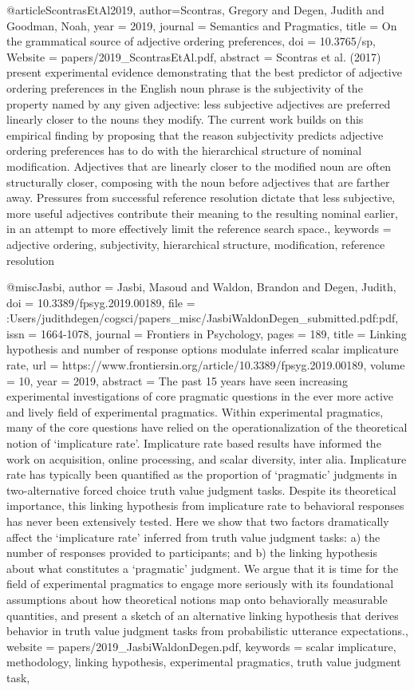 {@article{ScontrasEtAl2019,
author={Scontras, Gregory and Degen, Judith and Goodman, Noah},
year = {2019},
journal = {Semantics and Pragmatics},
title = {On the grammatical source of adjective ordering preferences},
doi = {10.3765/sp},
Website = {papers/2019_ScontrasEtAl.pdf},
abstract = {Scontras et al. (2017) present experimental evidence demonstrating that the best predictor of adjective ordering preferences in the English noun phrase is the subjectivity of the property named by any given adjective: less subjective adjectives are preferred linearly closer to the nouns they modify. The current work builds on this empirical finding by proposing that the reason subjectivity predicts adjective ordering preferences has to do with the hierarchical structure of nominal modification. Adjectives that are linearly closer to the modified noun are often structurally closer, composing with the noun before adjectives that are farther away. Pressures from successful reference resolution dictate that less subjective, more useful adjectives contribute their meaning to the resulting nominal earlier, in an attempt to more effectively limit the reference search space.},
keywords = {adjective ordering, subjectivity, hierarchical structure, modification, reference resolution}
}

@misc{Jasbi,
author = {Jasbi, Masoud and Waldon, Brandon and Degen, Judith},
doi = {10.3389/fpsyg.2019.00189},      
file = {:Users/judithdegen/cogsci/papers{\_}misc/JasbiWaldonDegen{\_}submitted.pdf:pdf},
issn = {1664-1078},   
journal = {Frontiers in Psychology},      
pages = {189},     
title = {{Linking hypothesis and number of response options modulate inferred scalar implicature rate}},
url = {https://www.frontiersin.org/article/10.3389/fpsyg.2019.00189},       
volume = {10},      
year = {2019},
abstract = {The past 15 years have seen increasing experimental investigations of core pragmatic questions in the ever more active and lively field of experimental pragmatics. Within experimental pragmatics, many of the core questions have relied on the operationalization of the theoretical notion of `implicature rate'. Implicature rate based results have informed the work on acquisition, online processing, and scalar diversity, inter alia. Implicature rate has typically been quantified as the proportion of `pragmatic' judgments in two-alternative forced choice truth value judgment tasks. Despite its theoretical importance, this linking hypothesis from implicature rate to behavioral responses has never been extensively tested. Here we show that two factors dramatically affect the `implicature rate' inferred from truth value judgment tasks: a) the number of responses provided to participants; and b) the linking hypothesis about what constitutes a `pragmatic' judgment. We argue that it is time for the field of experimental pragmatics to engage more seriously with its foundational assumptions about how theoretical notions map onto behaviorally measurable quantities, and present a sketch of an alternative linking hypothesis that derives behavior in truth value judgment tasks from probabilistic utterance expectations.},
website = {papers/2019_JasbiWaldonDegen.pdf},
keywords = {scalar implicature, methodology, linking hypothesis, experimental pragmatics, truth value judgment task},
}

}
